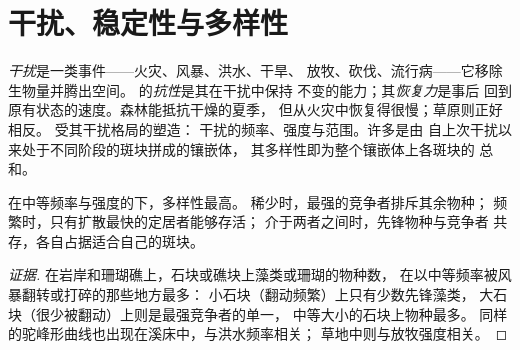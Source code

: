 \section{干扰、稳定性与多样性}

\begin{definition}[干扰、抗性与恢复力]\label{def:b1:ecosystem-dynamics:disturbance}
\emph{干扰}是一类事件——火灾、风暴、洪水、干旱、
放牧、砍伐、流行病——它移除生物量并腾出空间。
的\emph{抗性}是其在干扰中保持
不变的能力；其\emph{恢复力}是事后
回到原有状态的速度。森林能抵抗干燥的夏季，
但从火灾中恢复得很慢；草原则正好相反。
受其干扰格局的塑造：
干扰的频率、强度与范围。许多是由
自上次干扰以来处于不同阶段的斑块拼成的镶嵌体，
其多样性即为整个镶嵌体上各斑块的
总和。
\end{definition}

\begin{proposition}[中度干扰假说]\label{prop:b1:ecosystem-dynamics:idh}
在中等频率与强度的下，多样性最高。
稀少时，最强的竞争者排斥其余物种；
频繁时，只有扩散最快的定居者能够存活；
介于两者之间时，先锋物种与竞争者
共存，各自占据适合自己的斑块。
\end{proposition}
\begin{proof}[证据]
在岩岸和珊瑚礁上，石块或礁块上藻类或珊瑚的物种数，
在以中等频率被风暴翻转或打碎的那些地方最多：
小石块（翻动频繁）上只有少数先锋藻类，
大石块（很少被翻动）上则是最强竞争者的单一，
中等大小的石块上物种最多。
同样的驼峰形曲线也出现在溪床中，与洪水频率相关；
草地中则与放牧强度相关。
\end{proof}

